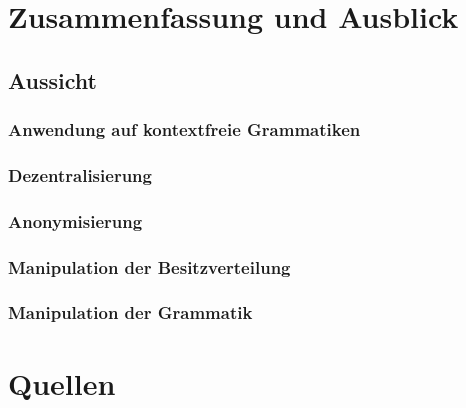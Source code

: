 \documentclass[]{article}
\begin{document}
\section{Zusammenfassung und Ausblick}

\subsection*{Aussicht}

\subsubsection*{Anwendung auf kontextfreie Grammatiken}



\subsubsection*{Dezentralisierung}

\subsubsection*{Anonymisierung}

\subsubsection*{Manipulation der Besitzverteilung}
\subsubsection*{Manipulation der Grammatik}






\newpage
\section{Quellen}





\end{document}
